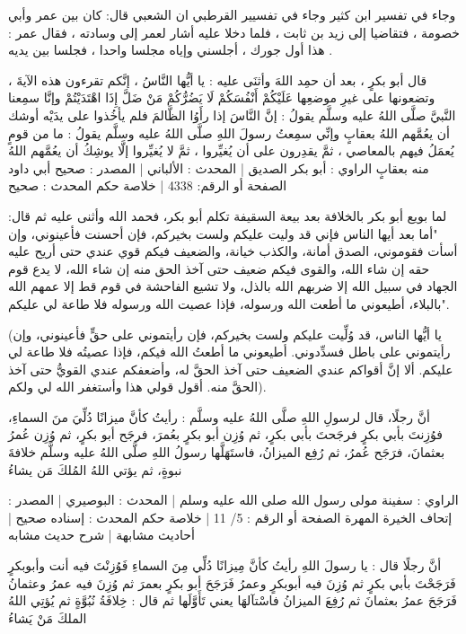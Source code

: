 وجاء في تفسير ابن كثير 
وجاء في تفسيير القرطبي ان الشعبي قال: كان بين عمر وأبي خصومة ، فتقاضيا إلى زيد بن ثابت ، فلما دخلا عليه أشار لعمر إلى وسادته ، فقال عمر : هذا أول جورك ، أجلسني وإياه مجلسا واحدا ، فجلسا بين يديه .

قال أبو بكرٍ ، بعد أن حمِد اللهَ وأثنَى عليه : يا أيُّها النَّاسُ ، إنَّكم تقرءون هذه الآيةَ ، وتضعونها على غيرِ موضعِها عَلَيْكُمْ أَنْفُسَكُمْ لَا يَضُرُّكُمْ مَنْ ضَلَّ إِذَا اهْتَدَيْتُمْ وإنَّا سمِعنا النَّبيَّ صلَّى اللهُ عليه وسلَّم يقولُ : إنَّ النَّاسَ إذا رأَوُا الظَّالمَ فلم يأخُذوا على يدَيْه أوشك أن يعُمَّهم اللهُ بعقابٍ وإنِّي سمِعتُ رسولَ اللهِ صلَّى اللهُ عليه وسلَّم يقولُ : ما من قومٍ يُعمَلُ فيهم بالمعاصي ، ثمَّ يقدِرون على أن يُغيِّروا ، ثمَّ لا يُغيِّروا إلَّا يوشِكُ أن يعُمَّهم اللهُ منه بعقابٍ
الراوي : أبو بكر الصديق | المحدث : الألباني | المصدر : صحيح أبي داود
الصفحة أو الرقم: 4338 | خلاصة حكم المحدث : صحيح


لما بويع أبو بكر بالخلافة بعد بيعة السقيفة تكلم أبو بكر، فحمد الله وأثنى عليه ثم قال:
"أما بعد أيها الناس فإني قد وليت عليكم ولست بخيركم، فإن أحسنت فأعينوني، وإن أسأت فقوموني، الصدق أمانة، والكذب خيانة، والضعيف فيكم قوي عندي حتى أريح عليه حقه إن شاء الله، والقوى فيكم ضعيف حتى آخذ الحق منه إن شاء الله، لا يدع قوم الجهاد في سبيل الله إلا ضربهم الله بالذل، ولا تشيع الفاحشة في قوم قط إلا عمهم الله بالبلاء، أطيعوني ما أطعت الله ورسوله، فإذا عصيت الله ورسوله فلا طاعة لي عليكم".

(يا أيُّها الناس، قد وُلِّيت عليكم ولست بخيركم، فإن رأيتموني على حقٍّ فأعينوني، وإن رأيتموني على باطل فسدِّدوني. أطيعوني ما أطعتُ الله فيكم، فإذا عصيتُه فلا طاعة لي عليكم. ألا إنَّ أقواكم عندي الضعيف حتى آخذ الحقَّ له، وأضعفكم عندي القويُّ حتى آخذ الحقَّ منه. أقول قولي هذا وأستغفر الله لي ولكم).

أنَّ رجلًا، قال لرسولِ اللهِ صلَّى اللهُ عليه وسلَّم : رأيتُ كأنَّ ميزانًا دُلِّيَ منَ السماءِ، فوُزِنتَ بأبي بكرٍ فرجَحتَ بأبي بكرٍ، ثم وُزِن أبو بكرٍ بعُمرَ، فرجَح أبو بكرٍ، ثم وُزِن عُمرُ بعثمانَ، فرَجَح عُمرُ، ثم رُفِع الميزانُ، فاستَهَلَّها رسولُ اللهِ صلَّى اللهُ عليه وسلَّم خلافةَ نبوةٍ، ثم يؤتي اللهُ المُلكَ مَن يشاءُ

الراوي : سفينة مولى رسول الله صلى الله عليه وسلم | المحدث : البوصيري | المصدر : إتحاف الخيرة المهرة
الصفحة أو الرقم : 5/ 11 | خلاصة حكم المحدث : إسناده صحيح | أحاديث مشابهة | شرح حديث مشابه

أنَّ رجلًا قال : يا رسولَ اللهِ رأيتُ كأنَّ مِيزانًا دُلِّي مِنَ السماءِ فَوُزِنْتَ فيه أنت وأبوبكرٍ فَرَجَحْتَ بأبي بكرٍ ثم وُزِنَ فيه أبوبكرٍ وعمرُ فَرَجَحَ أبو بكرٍ بعمرَ ثم وُزِنَ فيه عمرُ وعثمانُ فَرَجَحَ عمرُ بعثمانَ ثم رُفِعَ الميزانُ فاسْتآلهَا يعني تَأَوَّلَها ثم قال : خِلافَةُ نُبُوَّةٍ ثم يُؤتِي اللهُ الملكَ مَنْ يَشاءُ

